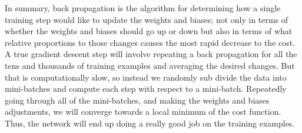 \documentclass[master]{thesis-uestc}
\begin{document}
In summary, back propagation is the algorithm for determining how a single training step would like to update the weights and biases; not only in terms of whether the weights and biases should go up or down but also in terms of what relative proportions to those changes causes the most rapid decrease to the cost. A true gradient descent step will involve repeating a back propagation for all the tens and thousands of training examples and averaging the desired changes. But that is computationally slow, so instead we randomly sub divide the data into mini-batches and compute each step with respect to a mini-batch. Repeatedly going through all of the mini-batches, and making the weights and biases adjustments, we will converge towards a local minimum of the cost function. Thus, the network will end up doing a really good job on the training examples.


\end{document}

